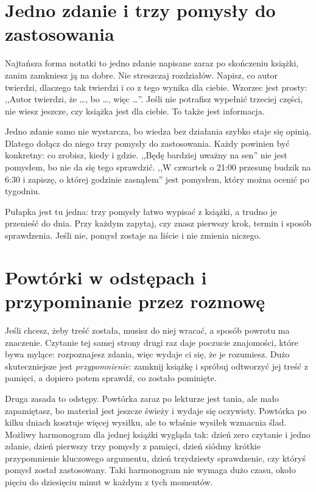 \section{Jedno zdanie i trzy pomysły do zastosowania}

Najtańsza forma notatki to jedno zdanie napisane zaraz po skończeniu książki, zanim zamkniesz ją na dobre. Nie streszczaj rozdziałów. Napisz, co autor twierdzi, dlaczego tak twierdzi i co z tego wynika dla ciebie. Wzorzec jest prosty: ,,Autor twierdzi, że \dots, bo \dots, więc \dots''. Jeśli nie potrafisz wypełnić trzeciej części, nie wiesz jeszcze, czy książka jest dla ciebie. To także jest informacja.

Jedno zdanie samo nie wystarcza, bo wiedza bez działania szybko staje się opinią. Dlatego dołącz do niego trzy pomysły do zastosowania. Każdy powinien być konkretny: co zrobisz, kiedy i gdzie. ,,Będę bardziej uważny na sen'' nie jest pomysłem, bo nie da się tego sprawdzić. ,,W czwartek o 21:00 przesunę budzik na 6:30 i zapiszę, o której godzinie zasnąłem'' jest pomysłem, który można ocenić po tygodniu.

Pułapka jest tu jedna: trzy pomysły łatwo wypisać z książki, a trudno je przenieść do dnia. Przy każdym zapytaj, czy znasz pierwszy krok, termin i sposób sprawdzenia. Jeśli nie, pomysł zostaje na liście i nie zmienia niczego.

\section{Powtórki w odstępach i przypominanie przez rozmowę}

Jeśli chcesz, żeby treść została, musisz do niej wracać, a sposób powrotu ma znaczenie. Czytanie tej samej strony drugi raz daje poczucie znajomości, które bywa mylące: rozpoznajesz zdania, więc wydaje ci się, że je rozumiesz. Dużo skuteczniejsze jest \emph{przypomnienie}: zamknij książkę i spróbuj odtworzyć jej treść z pamięci, a dopiero potem sprawdź, co zostało pominięte.

Druga zasada to odstępy. Powtórka zaraz po lekturze jest tania, ale mało zapamiętasz, bo materiał jest jeszcze świeży i wydaje się oczywisty. Powtórka po kilku dniach kosztuje więcej wysiłku, ale to właśnie wysiłek wzmacnia ślad. Możliwy harmonogram dla jednej książki wygląda tak: dzień zero czytanie i jedno zdanie, dzień pierwszy trzy pomysły z pamięci, dzień siódmy krótkie przypomnienie kluczowego argumentu, dzień trzydziesty sprawdzenie, czy któryś pomysł został zastosowany. Taki harmonogram nie wymaga dużo czasu, około pięciu do dziesięciu minut w każdym z tych momentów.

